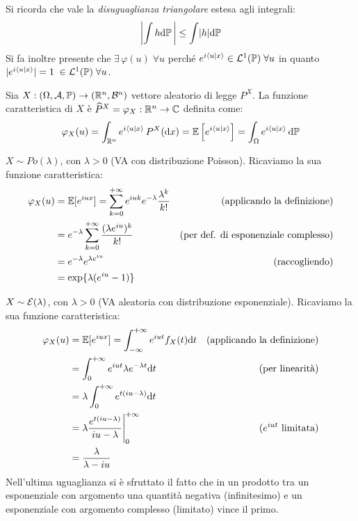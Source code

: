 Si ricorda che vale la \emph{disuguaglianza triangolare} estesa agli integrali:
$$\left| \int h \mathrm d \mathbb P \, \right| \leq \int \lvert h\rvert \mathrm d \mathbb P$$
Si fa inoltre presente che $\exists \, \varphi(u) \; \forall u$ perché $e^{i\langle u|x\rangle} \in \mathcal L^1(\mathbb P) \; \forall u$ in quanto $|e^{i \langle u|x\rangle}|=1 \; \in \mathcal L^1(\mathbb P) \; \forall u$.


\smallskip
\begin{defn}
  Sia $X:\DoCo$ vettore aleatorio di legge $P^X$. La funzione caratteristica di $X$ è $\widehat P^X =\varphi_X:\mathbb R^n\to \mathbb C$ definita come:
    $$\varphi_X(u)=\int_{\mathbb R^n}e^{i \langle u|x\rangle}\, P^X(\mathrm d x)=\mathbb E\left[e^{i \langle u|x\rangle}\right]=\int_\Omega e^{i \langle u|x\rangle}\, \mathrm d \mathbb P$$
\end{defn}

\begin{ese}
$X\sim Po (\lambda)$, con $\lambda > 0$ (VA con distribuzione Poisson).
Ricaviamo la sua funzione caratteristica:
  \begin{align*}
    \varphi_X(u) &=\mathbb E[e^{i u x}] = \sum_{k=0}^{{+\infty}}e^{i u k}e^{-\lambda}\frac{\lambda^k}{k!} & (\text{applicando la definizione})\\
    &= e^{-\lambda}\sum_{k=0}^{{+\infty}}\frac{(\lambda e^{i u})^k}{k!} & (\text{per def. di esponenziale complesso})\\
    &= e^{-\lambda}e^{\lambda e^{iu}} & (\text{raccogliendo})\\
    &=\exp \{ \lambda (e^{i u}-1)\}
  \end{align*}
\end{ese}

\begin{ese}
  $X\sim \mathcal E (\lambda)$, con $\lambda > 0$ (VA aleatoria con distribuzione esponenziale).
  Ricaviamo la sua funzione caratteristica:
  \begin{align*}
    \varphi_X(u) &=\mathbb E[e^{i u x}]
    =\int_{-\infty}^{+\infty}e^{iut}f_X(t) \mathrm d t & (\text{applicando la definizione})\\
    &= \int_{0}^{+\infty}e^{i u t}\lambda e^{-\lambda t} \mathrm d t & (\text{per linearità})\\
    &= \lambda \int_{0}^{+\infty} e^{t(i u -\lambda)}\mathrm d t\\
    &=\lambda \frac{e^{t(i u -\lambda)}}{i u -\lambda}\Bigg\rvert_{0}^{+\infty} & ( e^{iut} \text{ limitata})\\
    &=\frac{\lambda}{\lambda-iu}
  \end{align*}
Nell'ultima uguaglianza si è sfruttato il fatto che in un prodotto tra un esponenziale con argomento una quantità negativa (infinitesimo) e un esponenziale con argomento complesso (limitato) vince il primo.
\end{ese}

